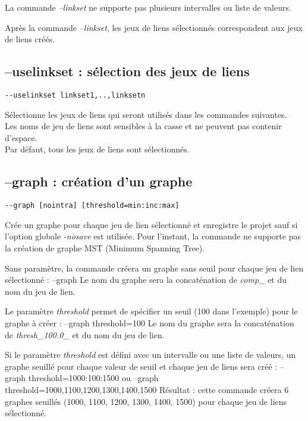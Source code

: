 \documentclass[a4paper,10pt]{report}
\newenvironment{cmd}
{\quote\Verbatim}
{\endVerbatim\endquote}
\begin{document}
La commande \textit{--linkset} ne supporte pas plusieurs intervalles ou liste de valeurs.

Après la commande \textit{--linkset}, les jeux de liens sélectionnés correspondent aux jeux de liens créés.

\subsection{--uselinkset : sélection des jeux de liens}
\begin{verbatim}
--uselinkset linkset1,..,linksetn
\end{verbatim}
Sélectionne les jeux de liens qui seront utilisés dans les commandes suivantes.\\
Les noms de jeu de liens sont sensibles à la casse et ne peuvent pas contenir d'espace.\\
Par défaut, tous les jeux de liens sont sélectionnés.

\subsection{--graph : création d'un graphe}
\begin{verbatim}
--graph [nointra] [threshold=min:inc:max]
\end{verbatim}
Crée un graphe pour chaque jeu de lien sélectionné et enregistre le projet sauf si l'option globale \textit{-nosave} est utilisée.
Pour l'instant, la commande ne supporte pas la création de graphe MST (Minimum Spanning Tree).

Sans paramètre, la commande créera un graphe sans seuil pour chaque jeu de lien sélectionné :
\begin{cmd}
--graph
\end{cmd}
Le nom du graphe sera la concaténation de \textit{comp\_} et du nom du jeu de lien.

Le paramètre \textit{threshold} permet de spécifier un seuil (100 dans l'exemple) pour le graphe à créer :
\begin{cmd}
--graph threshold=100
\end{cmd}
Le nom du graphe sera la concaténation de  \textit{thresh\_100.0\_} et du nom du jeu de lien.

Si le paramètre \textit{threshold} est défini avec un intervalle ou une liste de valeurs, un graphe seuillé pour chaque valeur de seuil et chaque jeu de liens sera créé :
\begin{cmd}
--graph threshold=1000:100:1500
ou
--graph threshold=1000,1100,1200,1300,1400,1500
\end{cmd}
Résultat : cette commande créera 6 graphes seuillés (1000, 1100, 1200, 1300, 1400, 1500) pour chaque jeu de liens sélectionné.
\end{document}
